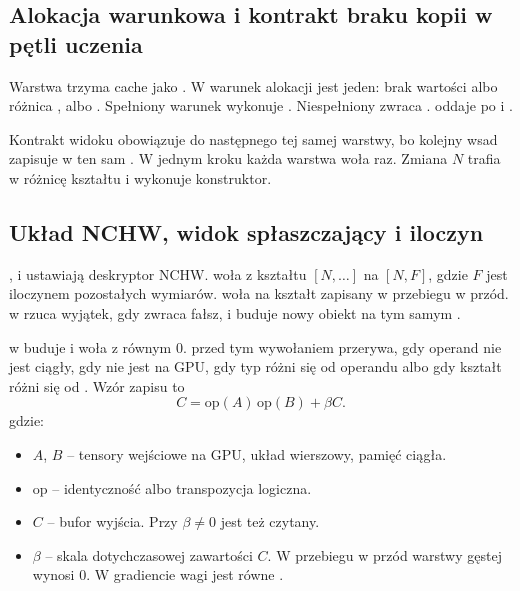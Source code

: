 \subsection{Alokacja warunkowa  i kontrakt braku kopii w pętli uczenia}

Warstwa trzyma cache jako . W  warunek alokacji jest jeden: brak wartości albo różnica ,  albo . Spełniony warunek wykonuje . Niespełniony zwraca .  oddaje  po  i .

Kontrakt widoku obowiązuje do następnego  tej samej warstwy, bo kolejny wsad zapisuje w ten sam . W jednym kroku każda warstwa woła  raz. Zmiana \(N\) trafia w różnicę kształtu i wykonuje konstruktor.

\subsection{Układ NCHW, widok spłaszczający i iloczyn }

,  i  ustawiają deskryptor NCHW.  woła  z kształtu \([N, \ldots]\) na \([N, F]\), gdzie \(F\) jest iloczynem pozostałych wymiarów.  woła  na kształt zapisany w przebiegu w przód.  w  rzuca wyjątek, gdy  zwraca fałsz, i buduje nowy obiekt na tym samym .

 w  buduje  i woła  z  równym \(0\).  przed tym wywołaniem przerywa, gdy operand nie jest ciągły, gdy  nie jest na GPU, gdy typ  różni się od operandu albo gdy kształt  różni się od . Wzór zapisu to
\begin{equation}
\label{eq:matmul-into}
C = \mathrm{op}(A)\,\mathrm{op}(B) + \beta C.
\end{equation}
gdzie:
\begin{itemize}
\item \(A\), \(B\) -- tensory wejściowe na GPU, układ wierszowy, pamięć ciągła.
\item \(\mathrm{op}\) -- identyczność albo transpozycja logiczna.
\item \(C\) -- bufor wyjścia. Przy \(\beta \neq 0\) jest też czytany.
\item \(\beta\) -- skala dotychczasowej zawartości \(C\). W przebiegu w przód warstwy gęstej wynosi \(0\). W gradiencie wagi jest równe .
\end{itemize}

